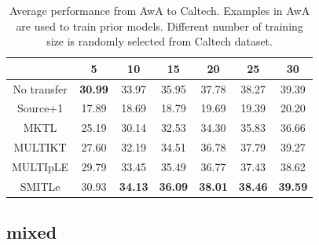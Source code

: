 \begin{table}[htbp]
  \centering
  \caption{Average performance from AwA to Caltech. Examples in AwA are used to train prior models. Different number of training size is randomly selected from Caltech dataset.}
    \begin{tabular}{ccccccc}
    \toprule
                & 5              & 10             & 15             & 20             & 25             & 30 \\
    \midrule
    No transfer &         \textbf{30.99 } &         33.97  &         35.95 &         37.78  &         38.27  &         39.39  \\
    Source+1    &         17.89  &         18.69  &         18.79  &         19.69  &         19.39  &         20.20  \\
    MKTL        &         25.19  &         30.14  &         32.53  &         34.30  &         35.83  &         36.66  \\
    MULTIKT     &         27.60  &         32.19  &         34.51  &         36.78  &         37.79  &         39.27  \\
    MULTIpLE    &         29.79  &         33.45  &         35.49  &         36.77  &         37.43  &         38.62  \\
    SMITLe        &       30.93  &         \textbf{34.13 } &         \textbf{36.09 } &         \textbf{38.01} &         \textbf{38.46} &         \textbf{39.59} \\
    \bottomrule
    \end{tabular}%
  \label{tab:A2C}%
\end{table}%

\subsection{mixed}

